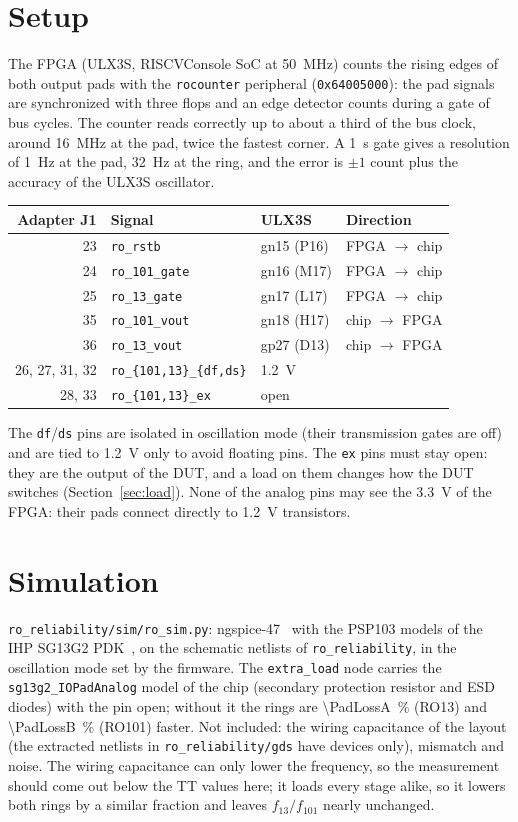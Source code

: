 \documentclass[10pt,a4paper]{article}
\begin{document}
\section{Setup}
The FPGA (ULX3S, RISCVConsole SoC at \SI{50}{MHz}) counts the rising edges of both output pads with the
\texttt{rocounter} peripheral (\texttt{0x64005000}): the pad signals are synchronized with three flops and
an edge detector counts during a gate of \BusHz{} bus cycles. The counter reads correctly up to about a
third of the bus clock, around \SI{16}{MHz} at the pad, twice the fastest corner. A \SI{1}{s} gate gives a
resolution of \SI{1}{Hz} at the pad, \SI{32}{Hz} at the ring, and the error is $\pm 1$ count plus the
accuracy of the ULX3S oscillator.
\begin{center}\small
\begin{tabular}{rlll}
\toprule
Adapter J1 & Signal & ULX3S & Direction \\
\midrule
23 & \texttt{ro\_rstb} & gn15 (P16) & FPGA $\to$ chip \\
24 & \texttt{ro\_101\_gate} & gn16 (M17) & FPGA $\to$ chip \\
25 & \texttt{ro\_13\_gate} & gn17 (L17) & FPGA $\to$ chip \\
35 & \texttt{ro\_101\_vout} & gn18 (H17) & chip $\to$ FPGA \\
36 & \texttt{ro\_13\_vout} & gp27 (D13) & chip $\to$ FPGA \\
26, 27, 31, 32 & \texttt{ro\_\{101,13\}\_\{df,ds\}} & \SI{1.2}{V} & \\
28, 33 & \texttt{ro\_\{101,13\}\_ex} & open & \\
\bottomrule
\end{tabular}
\end{center}
The \texttt{df}/\texttt{ds} pins are isolated in oscillation mode (their transmission gates are off) and are
tied to \SI{1.2}{V} only to avoid floating pins. The \texttt{ex} pins must stay open: they are the output of
the DUT, and a load on them changes how the DUT switches (Section~\ref{sec:load}). None of the analog pins may see the \SI{3.3}{V} of
the FPGA: their pads connect directly to \SI{1.2}{V} transistors.

\section{Simulation}
\texttt{ro\_reliability/sim/ro\_sim.py}: ngspice-47~\cite{ngspice} with the PSP103 models of the IHP SG13G2 PDK~\cite{ihppdk}, on the schematic
netlists of \texttt{ro\_reliability}, in the oscillation mode set by the firmware. The \texttt{extra\_load}
node carries the \texttt{sg13g2\_IOPadAnalog} model of the chip (secondary protection resistor and ESD
diodes) with the pin open; without it the rings are \SI{\PadLossA}{\percent} (RO13) and
\SI{\PadLossB}{\percent} (RO101) faster. Not included: the wiring capacitance of the layout (the extracted
netlists in \texttt{ro\_reliability/gds} have devices only), mismatch and noise. The wiring capacitance
can only lower the frequency, so the measurement should come out below the TT values here; it loads every
stage alike, so it lowers both rings by a similar fraction and leaves $f_{13}/f_{101}$ nearly unchanged.
\end{document}
